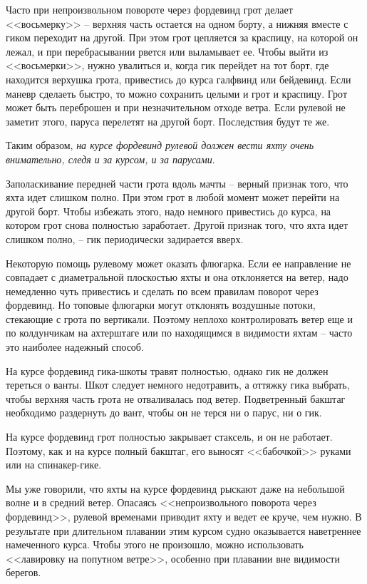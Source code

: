 \documentclass[a4paper, 12pt, twoside, final]{scrbook}
\begin{document}
Часто при непроизвольном повороте через фордевинд грот делает <<восьмерку>> \--- верхняя часть остается на одном борту, а нижняя вместе с гиком переходит на другой. При этом грот цепляется за краспицу, на которой он лежал, и при перебрасывании рвется или выламывает ее. Чтобы выйти из <<восьмерки>>, нужно увалиться и, когда гик перейдет на тот борт, где находится верхушка грота, привестись до курса галфвинд или бейдевинд. Если маневр сделаеть быстро, то можно сохранить целыми и грот и краспицу. Грот может быть переброшен и при незначительном отходе ветра. Если рулевой не заметит этого, паруса перелетят на другой борт. Последствия будут те же.

Таким образом, \textit{на курсе фордевинд рулевой должен вести яхту очень внимательно, следя и за курсом, и за парусами}.

Заполаскивание передней части грота вдоль мачты \--- верный признак того, что яхта идет слишком полно. При этом грот в любой момент может перейти на другой борт. Чтобы избежать этого, надо немного привестись до курса, на котором грот снова полностью заработает. Другой признак того, что яхта идет слишком полно, \--- гик периодически задирается вверх.

Некоторую помощь рулевому может оказать флюгарка. Если ее направление не совпадает с диаметральной плоскостью яхты и она отклоняется на ветер, надо немедленно чуть привестись и сделать по всем правилам поворот через фордевинд. Но топовые флюгарки могут отклонять воздушные потоки, стекающие с грота по вертикали. Поэтому неплохо контролировать ветер еще и по колдунчикам на ахтерштаге или по находящимся в видимости яхтам \--- часто это наиболее надежный способ.

На курсе фордевинд гика-шкоты травят полностью, однако гик не должен тереться о ванты. Шкот следует немного недотравить, а оттяжку гика выбрать, чтобы верхняя часть грота не отваливалась под ветер. Подветренный бакштаг необходимо раздернуть до вант, чтобы он не терся ни о парус, ни о гик.

На курсе фордевинд грот полностью закрывает стаксель, и он не работает. Поэтому, как и на курсе полный бакштаг, его выносят <<бабочкой>> руками или на спинакер-гике.

Мы уже говорили, что яхты на курсе фордевинд рыскают даже на небольшой волне и в средний ветер. Опасаясь <<непроизвольного поворота через фордевинд>>, рулевой временами приводит яхту и ведет ее круче, чем нужно. В результате при длительном плавании этим курсом судно оказывается наветреннее намеченного курса. Чтобы этого не произошло, можно использовать <<лавировку на попутном ветре>>, особенно при плавании вне видимости берегов.
\end{document}

